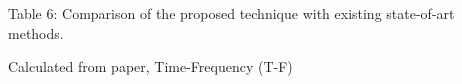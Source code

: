 \documentclass{article}
\begin{document}
Table 6: Comparison of the proposed technique with existing state-of-art methods.




Calculated from paper, Time-Frequency (T-F)
\end{document}
